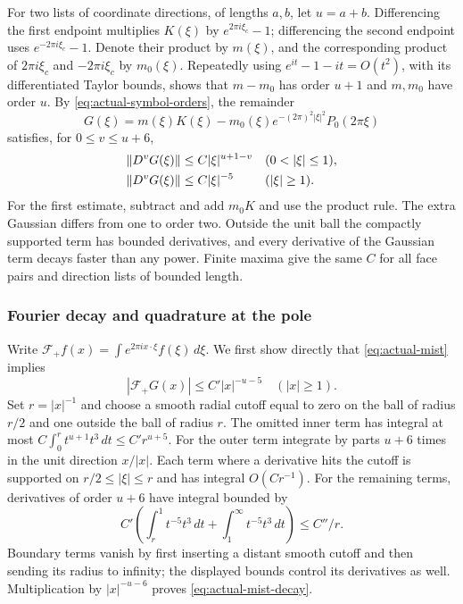 For two lists of coordinate directions, of lengths $a,b$, let
$u=a+b$. Differencing the first endpoint multiplies $K(\xi)$
by $e^{2\pi i\xi_c}-1$; differencing the second endpoint uses
$e^{-2\pi i\xi_c}-1$. Denote their product by $m(\xi)$,
and the corresponding product of $2\pi i\xi_c$ and
$-2\pi i\xi_c$ by $m_0(\xi)$. Repeatedly using
$e^{it}-1-it=O(t^2)$, with its differentiated Taylor bounds,
shows that $m-m_0$ has order $u+1$ and $m,m_0$ have order $u$.
By \eqref{eq:actual-symbol-orders}, the remainder
\[
 G(\xi)=m(\xi)K(\xi)
       -m_0(\xi)e^{-(2\pi)^2|\xi|^2}P_0(2\pi\xi)
\]
satisfies, for $0\le v\le u+6$,
\begin{align}\label{eq:actual-mist}
 \|D^vG(\xi)\|&\le C|\xi|^{u+1-v}
                              &&(0<|\xi|\le1),\\
 \|D^vG(\xi)\|&\le C|\xi|^{-5}
                              &&(|\xi|\ge1).\notag
\end{align}
For the first estimate, subtract and add $m_0K$ and use the
product rule. The extra Gaussian differs from one to order two.
Outside the unit ball the compactly supported term has bounded
derivatives, and every derivative of the Gaussian term decays
faster than any power. Finite maxima give the same $C$ for all
face pairs and direction lists of bounded length.

\subsubsection{Fourier decay and quadrature at the pole}

Write $\mathcal F_+f(x)=\int e^{2\pi i x\cdot\xi}f(\xi)\,d\xi$.
We first show directly that \eqref{eq:actual-mist} implies
\begin{equation}\label{eq:actual-mist-decay}
             |\mathcal F_+G(x)|\le C'|x|^{-u-5}
                                      \quad(|x|\ge1).
\end{equation}
Set $r=|x|^{-1}$ and choose a smooth radial cutoff equal to zero
on the ball of radius $r/2$ and one outside the ball of radius
$r$. The omitted inner term has integral at most
$C\int_0^r t^{u+1}t^3\,dt\le C'r^{u+5}$.
For the outer term integrate by parts $u+6$ times in the unit
direction $x/|x|$. Each term where a derivative hits the cutoff
is supported on $r/2\le|\xi|\le r$ and has integral
$O(Cr^{-1})$. For the remaining terms, derivatives of order
$u+6$ have integral bounded by
\[
 C'\left(\int_r^1 t^{-5}t^3\,dt+
                    \int_1^\infty t^{-5}t^3\,dt\right)
                  \le C''/r.
\]
Boundary terms vanish by first inserting a distant smooth cutoff
and then sending its radius to infinity; the displayed bounds
control its derivatives as well. Multiplication by
$|x|^{-u-6}$ proves \eqref{eq:actual-mist-decay}.

